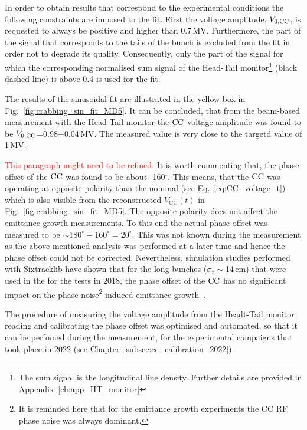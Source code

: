 In order to obtain results that correspond to the experimental conditions the following constraints are imposed to the fit. First the voltage amplitude, ${V_\mathrm{0, CC}}$, is requested to always be positive and higher than 0.7\,MV. Furthermore, the part of the signal that corresponds to the tails of the bunch is excluded from the fit in order not to degrade its quality. Consequently, only the part of the signal for which the corresponding normalised sum signal of the Head-Tail monitor\footnote{The sum signal is the longitudinal line density. Further details are provided in Appendix~\ref{ch:app_HT_monitor}} (black dashed line) is above 0.4 is used for the fit. 

The results of the sinusoidal fit are illustrated in the yellow box in Fig.~\ref{fig:crabbing_sin_fit_MD5}. It can be concluded, that from the beam-based measurement with the Head-Tail monitor the ${\mathrm{CC}}$ voltage amplitude was found to be ${V_\mathrm{0, CC}}$=0.98$\pm$0.04\,MV. The measured value is very close to the targetd value of 1\,MV. 

\textcolor{red}{This paragraph might need to be refined.}
It is worth commenting that, the phase offset of the ${\mathrm{CC}}$ was found to be about -160$^\circ$. This means, that the ${\mathrm{CC}}$ was operating at opposite polarity than the nominal (see Eq.~\eqref{eq:CC_voltage_t}) which is also visible from the reconstructed $V_\mathrm{CC}(t)$ in Fig.~\ref{fig:crabbing_sin_fit_MD5}. The opposite polarity does not affect the emittance growth measurements. To this end the actual phase offset was measured to be $\sim 180^\circ-160^\circ=20^\circ$. This was not known during the measurement as the above mentioned analysis was performed at a later time and hence the phase offset could not be corrected. Nevertheless, simulation studies performed with Sixtracklib have shown that for the long bunches ($\sigma_z \sim$14\,cm) that were used in the for the tests in 2018, the phase offset of the ${\mathrm{CC}}$ has no significant impact on the phase noise\footnote{It is reminded here that for the emittance growth experiments the CC RF phase noise was always dominant.} induced emittance growth~\cite{wp4_triantafyllou_2020}. %

The procedure of measuring the voltage amplitude from the Headt-Tail monitor reading and calibrating the phase offset was optimised and automated, so that it can be perfomed during the measurement, for the experimental campaigns that took place in 2022 (see Chapter~\ref{subsec:cc_calibration_2022}). 

